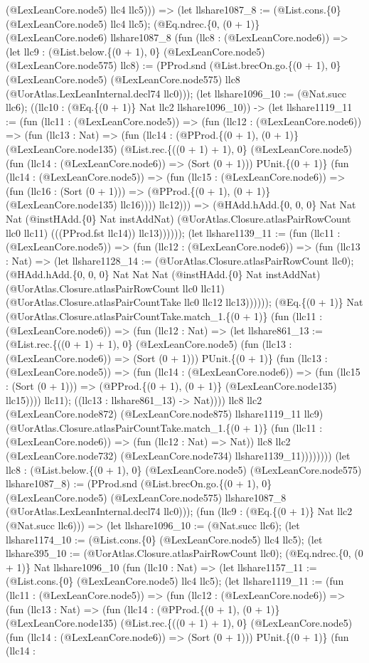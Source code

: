 \documentclass[11pt]{article}
\begin{document}
(@LexLeanCore.node5) llc4 llc5))) => (let llshare1087\_8 := (@List.cons.\{0\} (@LexLeanCore.node5) llc4 llc5); (@Eq.ndrec.\{0, (0 + 1)\} (@LexLeanCore.node6) llshare1087\_8 (fun (llc8 : (@LexLeanCore.node6)) => (let llc9 : (@List.below.\{(0 + 1), 0\} (@LexLeanCore.node5) (@LexLeanCore.node575) llc8) := (PProd.snd (@List.brecOn.go.\{(0 + 1), 0\} (@LexLeanCore.node5) (@LexLeanCore.node575) llc8 (@UorAtlas.LexLeanInternal.decl74 llc0))); (let llshare1096\_10 := (@Nat.succ llc6); ((llc10 : (@Eq.\{(0 + 1)\} Nat llc2 llshare1096\_10)) -> (let llshare1119\_11 := (fun (llc11 : (@LexLeanCore.node5)) => (fun (llc12 : (@LexLeanCore.node6)) => (fun (llc13 : Nat) => (fun (llc14 : (@PProd.\{(0 + 1), (0 + 1)\} (@LexLeanCore.node135) (@List.rec.\{((0 + 1) + 1), 0\} (@LexLeanCore.node5) (fun (llc14 : (@LexLeanCore.node6)) => (Sort (0 + 1))) PUnit.\{(0 + 1)\} (fun (llc14 : (@LexLeanCore.node5)) => (fun (llc15 : (@LexLeanCore.node6)) => (fun (llc16 : (Sort (0 + 1))) => (@PProd.\{(0 + 1), (0 + 1)\} (@LexLeanCore.node135) llc16)))) llc12))) => (@HAdd.hAdd.\{0, 0, 0\} Nat Nat Nat (@instHAdd.\{0\} Nat instAddNat) (@UorAtlas.Closure.atlasPairRowCount llc0 llc11) (((PProd.fst llc14)) llc13)))))); (let llshare1139\_11 := (fun (llc11 : (@LexLeanCore.node5)) => (fun (llc12 : (@LexLeanCore.node6)) => (fun (llc13 : Nat) => (let llshare1128\_14 := (@UorAtlas.Closure.atlasPairRowCount llc0); (@HAdd.hAdd.\{0, 0, 0\} Nat Nat Nat (@instHAdd.\{0\} Nat instAddNat) (@UorAtlas.Closure.atlasPairRowCount llc0 llc11) (@UorAtlas.Closure.atlasPairCountTake llc0 llc12 llc13)))))); (@Eq.\{(0 + 1)\} Nat (@UorAtlas.Closure.atlasPairCountTake.match\_1.\{(0 + 1)\} (fun (llc11 : (@LexLeanCore.node6)) => (fun (llc12 : Nat) => (let llshare861\_13 := (@List.rec.\{((0 + 1) + 1), 0\} (@LexLeanCore.node5) (fun (llc13 : (@LexLeanCore.node6)) => (Sort (0 + 1))) PUnit.\{(0 + 1)\} (fun (llc13 : (@LexLeanCore.node5)) => (fun (llc14 : (@LexLeanCore.node6)) => (fun (llc15 : (Sort (0 + 1))) => (@PProd.\{(0 + 1), (0 + 1)\} (@LexLeanCore.node135) llc15)))) llc11); ((llc13 : llshare861\_13) -> Nat)))) llc8 llc2 (@LexLeanCore.node872) (@LexLeanCore.node875) llshare1119\_11 llc9) (@UorAtlas.Closure.atlasPairCountTake.match\_1.\{(0 + 1)\} (fun (llc11 : (@LexLeanCore.node6)) => (fun (llc12 : Nat) => Nat)) llc8 llc2 (@LexLeanCore.node732) (@LexLeanCore.node734) llshare1139\_11)))))))) (let llc8 : (@List.below.\{(0 + 1), 0\} (@LexLeanCore.node5) (@LexLeanCore.node575) llshare1087\_8) := (PProd.snd (@List.brecOn.go.\{(0 + 1), 0\} (@LexLeanCore.node5) (@LexLeanCore.node575) llshare1087\_8 (@UorAtlas.LexLeanInternal.decl74 llc0))); (fun (llc9 : (@Eq.\{(0 + 1)\} Nat llc2 (@Nat.succ llc6))) => (let llshare1096\_10 := (@Nat.succ llc6); (let llshare1174\_10 := (@List.cons.\{0\} (@LexLeanCore.node5) llc4 llc5); (let llshare395\_10 := (@UorAtlas.Closure.atlasPairRowCount llc0); (@Eq.ndrec.\{0, (0 + 1)\} Nat llshare1096\_10 (fun (llc10 : Nat) => (let llshare1157\_11 := (@List.cons.\{0\} (@LexLeanCore.node5) llc4 llc5); (let llshare1119\_11 := (fun (llc11 : (@LexLeanCore.node5)) => (fun (llc12 : (@LexLeanCore.node6)) => (fun (llc13 : Nat) => (fun (llc14 : (@PProd.\{(0 + 1), (0 + 1)\} (@LexLeanCore.node135) (@List.rec.\{((0 + 1) + 1), 0\} (@LexLeanCore.node5) (fun (llc14 : (@LexLeanCore.node6)) => (Sort (0 + 1))) PUnit.\{(0 + 1)\} (fun (llc14 : 
\end{document}
